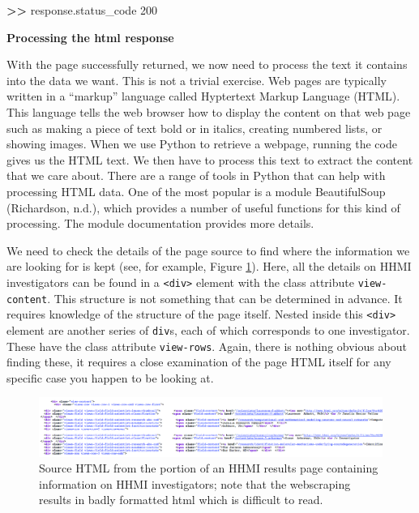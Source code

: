 \documentclass[]{krantz}
\newenvironment{Shaded}{\begin{snugshade}}{\end{snugshade}}
\newcommand{\DecValTok}[1]{\textcolor[rgb]{0.00,0.00,0.81}{#1}}
\newcommand{\StringTok}[1]{\textcolor[rgb]{0.31,0.60,0.02}{#1}}
\newcommand{\OperatorTok}[1]{\textcolor[rgb]{0.81,0.36,0.00}{\textbf{#1}}}
\newcommand{\ErrorTok}[1]{\textcolor[rgb]{0.64,0.00,0.00}{\textbf{#1}}}
\newcommand{\NormalTok}[1]{#1}
\begin{document}
\begin{Shaded}
\begin{Highlighting}[]
\OperatorTok{>}\ErrorTok{>}\StringTok{ }\NormalTok{response.status_code}
\DecValTok{200}
\end{Highlighting}
\end{Shaded}

\textbf{Processing the html response}

With the page successfully returned, we now need to process the text it
contains into the data we want. This is not a trivial exercise. Web
pages are typically written in a ``markup'' language called Hyptertext
Markup Language (HTML). This language tells the web browser how to
display the content on that web page such as making a piece of text bold
or in italics, creating numbered lists, or showing images. When we use
Python to retrieve a webpage, running the code gives us the HTML text.
We then have to process this text to extract the content that we care
about. There are a range of tools in Python that can help with
processing HTML data. One of the most popular is a module BeautifulSoup
(Richardson, n.d.), which provides a number of useful functions for this
kind of processing. The module documentation provides more details.

We need to check the details of the page source to find where the
information we are looking for is kept (see, for example, Figure
\ref{fig:fig2-1}). Here, all the details on HHMI investigators can be
found in a \texttt{\textless{}div\textgreater{}} element with the class
attribute \texttt{view-content}. This structure is not something that
can be determined in advance. It requires knowledge of the structure of
the page itself. Nested inside this
\texttt{\textless{}div\textgreater{}} element are another series of
\texttt{div}s, each of which corresponds to one investigator. These have
the class attribute \texttt{view-rows}. Again, there is nothing obvious
about finding these, it requires a close examination of the page HTML
itself for any specific case you happen to be looking at.

\begin{figure}

{\centering \includegraphics[width=0.9\linewidth]{ChapterWeb/figures/fig2-1} 

}

\caption{Source HTML from the portion of an HHMI results page containing information on HHMI investigators; note that the webscraping results in badly formatted html which is difficult to read.}\label{fig:fig2-1}
\end{figure}
\end{document}
